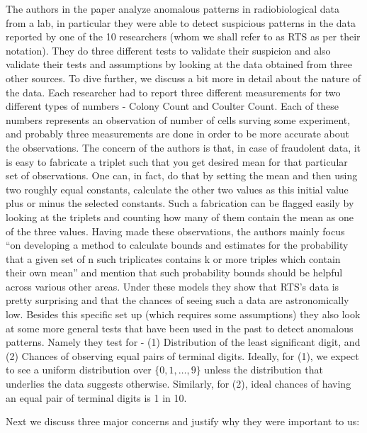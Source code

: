 \documentclass{article}
\begin{document}
The authors in the paper analyze anomalous patterns in radiobiological
data from a lab, in particular they were able to detect suspicious
patterns in the data reported by one of the 10 researchers (whom we
shall refer to as RTS as per their notation). They do three different
tests to validate their suspicion and also validate their tests and
assumptions by looking at the data obtained from three other sources. To
dive further, we discuss a bit more in detail about the nature of the
data. Each researcher had to report three different measurements for two
different types of numbers - Colony Count and Coulter Count. Each of
these numbers represents an observation of number of cells surving some
experiment, and probably three measurements are done in order to be more
accurate about the observations. The concern of the authors is that, in
case of fraudolent data, it is easy to fabricate a triplet such that you
get desired mean for that particular set of observations. One can, in
fact, do that by setting the mean and then using two roughly equal
constants, calculate the other two values as this initial value plus or
minus the selected constants. Such a fabrication can be flagged easily
by looking at the triplets and counting how many of them contain the
mean as one of the three values. Having made these observations, the
authors mainly focus ``on developing a method to calculate bounds and
estimates for the probability that a given set of n such triplicates
contains k or more triples which contain their own mean'' and mention
that such probability bounds should be helpful across various other
areas. Under these models they show that RTS's data is pretty surprising
and that the chances of seeing such a data are astronomically low.
Besides this specific set up (which requires some assumptions) they also
look at some more general tests that have been used in the past to
detect anomalous patterns. Namely they test for - (1) Distribution of
the least significant digit, and (2) Chances of observing equal pairs of
terminal digits. Ideally, for (1), we expect to see a uniform
distribution over \(\{0, 1, \ldots, 9\}\) unless the distribution that
underlies the data suggests otherwise. Similarly, for (2), ideal chances
of having an equal pair of terminal digits is 1 in 10.

Next we discuss three major concerns and justify why they were important
to us:
\end{document}
